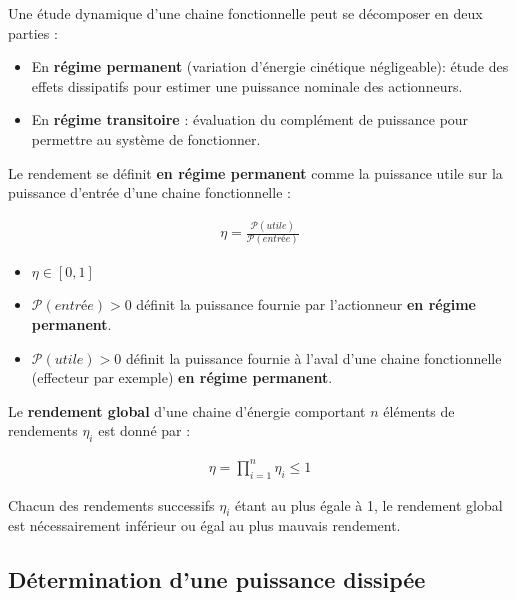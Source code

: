 \documentclass[a4paper,10pt]{article}
\begin{document}
Une étude dynamique d'une chaine fonctionnelle peut se décomposer en deux parties :

\begin{itemize}
\item En \textbf{régime permanent} (variation d'énergie cinétique négligeable): étude des effets dissipatifs pour estimer une puissance nominale des actionneurs.
\item En \textbf{régime transitoire} : évaluation du complément de puissance pour permettre au système de fonctionner.
\end{itemize} 

\begin{definition}
Le rendement se définit \textbf{en régime permanent} comme la puissance utile sur la puissance d'entrée d'une chaine fonctionnelle : 

\begin{align*}
\boxed{
\eta=\frac{\mathcal{P}(utile)}{\mathcal{P}(entrée)}
}
\end{align*}

\begin{itemize}
\item $\eta\in\left[0,1\right]$
\item $\mathcal{P}(entrée)>0$ définit la puissance fournie par l'actionneur \textbf{en régime permanent}.
\item $\mathcal{P}(utile)>0$ définit la puissance fournie à l'aval d'une chaine fonctionnelle (effecteur par exemple) \textbf{en régime permanent}.
\end{itemize}
\end{definition}

\begin{propriete}
Le \textbf{rendement global} d'une chaine d'énergie comportant $n$ éléments de rendements $\eta_i$ est donné par : 

\begin{align}
\boxed{
\displaystyle{\eta=\prod_{i=1}^n\eta_i\leq 1}
}
\end{align}

Chacun des rendements successifs $\eta_i$ étant au plus égale à 1, le rendement global est nécessairement inférieur ou égal au plus mauvais rendement.
\end{propriete}

\subsection{Détermination d'une puissance dissipée}
\end{document}
